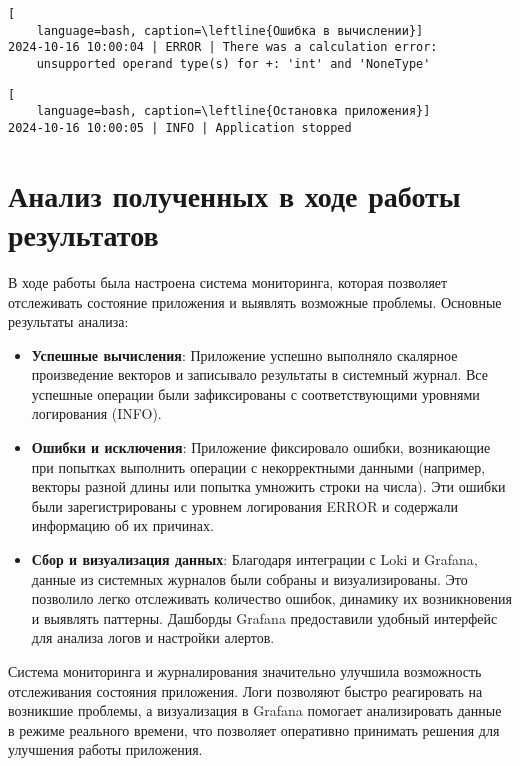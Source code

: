 \begin{lstlisting}[
	language=bash, caption=\leftline{Ошибка в вычислении}]
2024-10-16 10:00:04 | ERROR | There was a calculation error:
	unsupported operand type(s) for +: 'int' and 'NoneType'
\end{lstlisting}

\begin{lstlisting}[
	language=bash, caption=\leftline{Остановка приложения}]
2024-10-16 10:00:05 | INFO | Application stopped
\end{lstlisting}

\section{Анализ полученных в ходе работы результатов}

В ходе работы была настроена система мониторинга,
которая позволяет отслеживать состояние приложения
и выявлять возможные проблемы.
Основные результаты анализа:

\begin{itemize}
    \item \textbf{Успешные вычисления}:
		Приложение успешно выполняло скалярное произведение векторов
		и записывало результаты в системный журнал.
		Все успешные операции были зафиксированы
		с соответствующими уровнями логирования (INFO).
    \item \textbf{Ошибки и исключения}:
		Приложение фиксировало ошибки,
		возникающие при попытках выполнить операции с некорректными данными
		(например, векторы разной длины или попытка умножить строки на числа).
		Эти ошибки были зарегистрированы с уровнем логирования ERROR
		и содержали информацию об их причинах.
    \item \textbf{Сбор и визуализация данных}:
		Благодаря интеграции с Loki и Grafana,
		данные из системных журналов были собраны и визуализированы.
		Это позволило легко отслеживать количество ошибок,
		динамику их возникновения и выявлять паттерны.
		Дашборды Grafana предоставили удобный интерфейс
		для анализа логов и настройки алертов.
\end{itemize}

Система мониторинга и журналирования значительно улучшила возможность
отслеживания состояния приложения.
Логи позволяют быстро реагировать на возникшие проблемы,
а визуализация в Grafana помогает анализировать данные
в режиме реального времени,
что позволяет оперативно принимать решения
для улучшения работы приложения.

\clearpage


